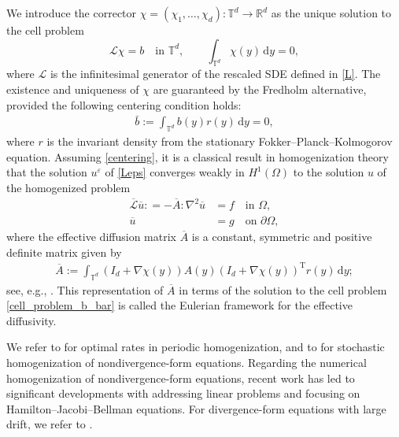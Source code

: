 \documentclass[12pt,a4paper,reqno]{amsart}
\newcommand{\R}{\mathbb{R}}
\newcommand{\T}{\mathbb{T}}
\numberwithin{equation}{section}
\begin{document}
We introduce the corrector $\chi = (\chi_1,\ldots,\chi_d):\mathbb{T}^d\rightarrow \R^d$ as the unique solution to the cell problem
\begin{equation}\label{cell_problem_b_bar}
    \mathcal{L}\chi = b \quad\text{in }\mathbb{T}^d, \qquad \int_{\mathbb{T}^d}\chi(y)\, \mathrm{d}y = 0,
\end{equation} 
where $\mathcal{L}$ is the infinitesimal generator of the rescaled SDE defined in \eqref{L}. The existence and uniqueness of $\chi $ are guaranteed by the Fredholm alternative, provided the following centering condition holds:
\begin{align}\label{centering}
	\bar{b} := \int_{\mathbb{T}^d} b(y) r(y)\, \mathrm{d}y = 0,
\end{align}
where $r$ is the invariant density from the stationary Fokker--Planck--Kolmogorov equation. Assuming \eqref{centering}, it is a classical result in homogenization theory that the solution $u^{\varepsilon}$ of \eqref{Leps} converges weakly in $H^1(\Omega)$ to the solution $u$ of the homogenized problem
\begin{equation*}
\begin{aligned}
    \overline{\mathcal{L}} \overline{u}: =-\overline{A}:\nabla^2 \overline{u}  &= f\quad \text{in }\Omega,\\
    \overline{u} &= g\quad \text{on }\partial \Omega,
    \end{aligned}
\end{equation*} 
where the effective diffusion matrix $\overline{A}$ is a constant, symmetric and positive definite matrix given by
\begin{align}\label{Effective diffusivity}
\overline{A} := \int_{\T^d} \left(I_d + \nabla \chi(y)\right)A(y)\left(I_d+\nabla \chi(y)\right)^{\mathrm{T}}r(y)\,\mathrm{d}y; 
\end{align} 
see, e.g., \cite{BLP11,ES08,JKO94,JZ23}. This representation of $\overline{A}$ in terms of the solution to the cell problem \eqref{cell_problem_b_bar} is called the Eulerian framework for the effective diffusivity. 

We refer to \cite{CSS20,GST22,GTY20,KL16,Spr24,ST21} for optimal rates in periodic homogenization, and to \cite{AFL22,AL17,AS14,GT23,GT22} for stochastic homogenization of nondivergence-form equations. Regarding the numerical homogenization of nondivergence-form equations, recent work has led to significant developments with \cite{CSS20,FGP24,Spr24} addressing linear problems and \cite{GSS21,KS22,QST24} focusing on Hamilton--Jacobi--Bellman equations. For divergence-form equations with large drift, we refer to \cite{BLL24,BFP24,HO10,LLM17,LPS18,ZC23}.
\end{document}
